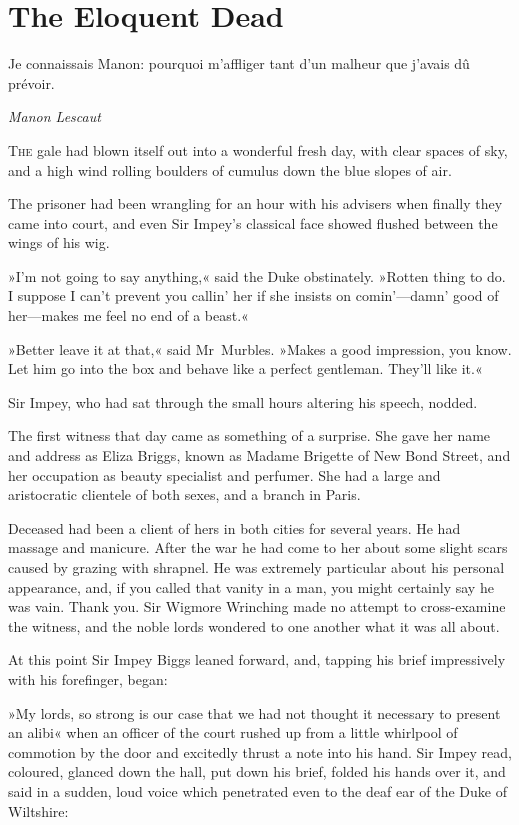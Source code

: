 

\chapter{The Eloquent Dead}

\epigraph{\begin{french}Je connaissais Manon: pourquoi m'affliger tant d'un malheur que j'avais dû prévoir.\end{french}}{\textit{Manon Lescaut}}



\lettrine[lines=4]{T}{he} gale had blown itself out into a wonderful fresh day, with clear spaces of sky, and a high wind rolling boulders of cumulus down the blue slopes of air.

\zz
The prisoner had been wrangling for an hour with his advisers when finally they came into court, and even Sir Impey's classical face showed flushed between the wings of his wig.

»I'm not going to say anything,« said the Duke obstinately. »Rotten thing to do. I suppose I can't prevent you callin' her if she insists on comin'—damn' good of her—makes me feel no end of a beast.«

»Better leave it at that,« said Mr~Murbles. »Makes a good impression, you know. Let him go into the box and behave like a perfect gentleman. They'll like it.«

Sir Impey, who had sat through the small hours altering his speech, nodded.

The first witness that day came as something of a surprise. She gave her name and address as Eliza Briggs, known as Madame Brigette of New Bond Street, and her occupation as beauty specialist and perfumer. She had a large and aristocratic clientele of both sexes, and a branch in Paris.

Deceased had been a client of hers in both cities for several years. He had massage and manicure. After the war he had come to her about some slight scars caused by grazing with shrapnel. He was extremely particular about his personal appearance, and, if you called that vanity in a man, you might certainly say he was vain. Thank you. Sir Wigmore Wrinching made no attempt to cross-examine the witness, and the noble lords wondered to one another what it was all about.

At this point Sir Impey Biggs leaned forward, and, tapping his brief impressively with his forefinger, began:

»My lords, so strong is our case that we had not thought it necessary to present an alibi\longdash« when an officer of the court rushed up from a little whirlpool of commotion by the door and excitedly thrust a note into his hand. Sir Impey read, coloured, glanced down the hall, put down
his brief, folded his hands over it, and said in a sudden, loud voice which penetrated even to the deaf ear of the Duke of Wiltshire:

